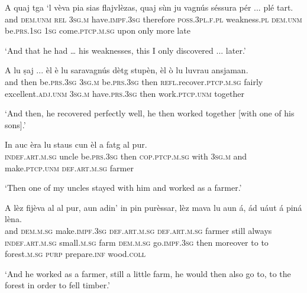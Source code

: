 \begin{linenumbers}
\gll A quaj tga `l vèva pia sias flajvlèzas, quaj sùn ju vagnús séssura pér ... plé tart.   \\
and \textsc{dem.unm} \textsc{rel} \textsc{3sg.m} have.\textsc{impf.3sg} therefore \textsc{poss.3pl.f.pl} weakness.\textsc{pl} \textsc{dem.unm} be.\textsc{prs.1sg} \textsc{1sg} come.\textsc{ptcp.m.sg} upon only {} more late\\
\end{linenumbers}
\medskip
\glt `And that he had … his weaknesses, this I only discovered ... later.'
\medskip

\begin{linenumbers}
\gll A lu ṣaj ... èl è lu saravagnús dètg stupèn, èl ò lu luvrau ansjaman.   \\
and then be.\textsc{prs.3sg} {} \textsc{3sg.m} be.\textsc{prs.3sg} then \textsc{refl}.recover.\textsc{ptcp.m.sg} fairly  excellent.\textsc{adj.unm} \textsc{3sg.m} have.\textsc{prs.3sg} then work.\textsc{ptcp.unm} together  \\
\end{linenumbers}
\medskip
\glt `And then, he recovered perfectly well, he then worked together [with one of his sons].'
\medskip

\begin{linenumbers}
\gll  In auc èra lu staus cun èl a fatg al pur.  \\
 \textsc{indef.art.m.sg} uncle be.\textsc{prs.3sg} then \textsc{cop.ptcp.m.sg} with \textsc{3sg.m} and make.\textsc{ptcp.unm} \textsc{def.art.m.sg} farmer\\
\end{linenumbers}
\medskip
\glt `Then one of my uncles stayed with him and worked as a farmer.'
\medskip

\begin{linenumbers}
\gll  A lèz fijèva al al pur, aun adin’ in pin purèssar, lèz mava lu aun á, ád uáut á piná lèna.  \\
and \textsc{dem.m.sg} make.\textsc{impf.3sg} \textsc{def.art.m.sg} \textsc{def.art.m.sg} farmer still always \textsc{indef.art.m.sg} small.\textsc{m.sg} farm \textsc{dem.m.sg} go.\textsc{impf.3sg} then moreover to to forest.\textsc{m.sg} \textsc{purp} prepare.\textsc{inf} wood.\textsc{coll}\\
\end{linenumbers}
\medskip
\glt `And he worked as a farmer, still a little farm, he would then also go to, to the forest in order to fell timber.'
\medskip

